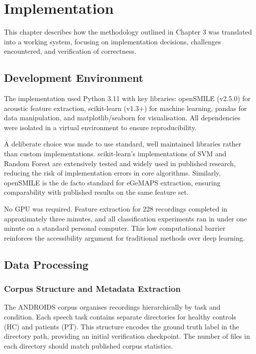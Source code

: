 \chapter{Implementation}

This chapter describes how the methodology outlined in Chapter 3 was translated into a working system, focusing on implementation decisions, challenges encountered, and verification of correctness.

\section{Development Environment}

The implementation used Python 3.11 with key libraries: openSMILE (v2.5.0) for acoustic feature extraction, scikit-learn (v1.3+) for machine learning, pandas for data manipulation, and matplotlib/seaborn for visualisation. All dependencies were isolated in a virtual environment to ensure reproducibility.

A deliberate choice was made to use standard, well maintained libraries rather than custom implementations. scikit-learn's implementations of SVM and Random Forest are extensively tested and widely used in published research, reducing the risk of implementation errors in core algorithms. Similarly, openSMILE is the de facto standard for eGeMAPS extraction, ensuring comparability with published results on the same feature set.

No GPU was required. Feature extraction for 228 recordings completed in approximately three minutes, and all classification experiments ran in under one minute on a standard personal computer. This low computational barrier reinforces the accessibility argument for traditional methods over deep learning.

\section{Data Processing}

\subsection{Corpus Structure and Metadata Extraction}

The ANDROIDS corpus organises recordings hierarchically by task and condition. Each speech task contains separate directories for healthy controls (HC) and patients (PT). This structure encodes the ground truth label in the directory path, providing an initial verification checkpoint. The number of files in each directory should match published corpus statistics.

